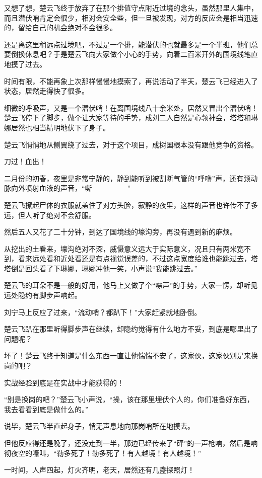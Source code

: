 又想了想，楚云飞终于放弃了在那个排值守点附近过境的念头，虽然那里人集中，而且潜伏哨肯定会很少，相对会安全些，但一旦被发现，对方的反应会是相当迅速的，留给自己的机会绝对不会很多。

还是离这里稍远点过境吧，不过是一个排，能潜伏的也就最多是一个半班，他们总要倒换休息吧？于是楚云飞向大家做个小心的手势，向着二百米开外的国境线笔直地摸了过去。

时间有限，不能再象上次那样慢慢地摸索了，再说活动了半天，楚云飞已经进入了状态，居然走得快了很多。

细微的呼吸声，又是一个潜伏哨！在离国境线八十余米处，居然又冒出个潜伏哨！楚云飞停下了脚步，做个让大家等待的手势，成刘二人自然是心领神会，塔塔和琳娜居然也相当精明地伏下了身子。

楚云飞悄悄地从侧翼绕了过去，对于这个项目，成树国根本没有跟他竞争的资格。

刀过！血出！

二月份的初春，夜里是非常宁静的，静到能听到被割断气管的“呼噜”声，还有颈动脉向外喷射血液的声音，“嘶~~~~~~~~~~”

楚云飞撩起尸体的衣服就盖住了对方头脸，寂静的夜里，这样的声音也许传不了多远，但人听了绝对不会舒服。

然后五人又花了二十分钟，到达了国境线的壕沟旁，再没有遇到新的麻烦。

从挖出的土看来，壕沟绝对不深，威慑意义远大于实际意义，况且只有两米宽不到，看来远处看和近处看还是有点视觉误差的，不过这点宽度给谁也能跳过去，塔塔倒是回头看了下琳娜，琳娜冲他一笑，小声说“我能跳过去。”

楚云飞的耳朵不是一般的好用，他马上又做了个“噤声”的手势，大家一愣，却听见远处隐约有脚步声响起。

刘宁马上反应了过来，“流动哨？都趴下！”大家赶紧就地卧倒。

楚云飞趴在那里听得脚步声在继续，却隐约觉得有什么地方不妥，到底是哪里出了问题呢？

坏了！楚云飞终于知道是什么东西一直让他惴惴不安了，这家伙，这家伙别是来换岗的吧？

实战经验到底是在实战中才能获得的！

“别是换岗的吧？”楚云飞小声说，“操，该在那里埋伏个人的，你们准备好东西，我去看看到底是做什么的。”

说毕，楚云飞半直起身子，悄无声息地向那岗哨所在地摸去。

但他反应得还是晚了，还没走到一半，那边已经传来了“砰”的一声枪响，然后是响彻夜空的嚎叫，“勒多死了！勒多死了！有人越境！有人越境！”

一时间，人声四起，灯火齐明，老天，居然还有几盏探照灯！

